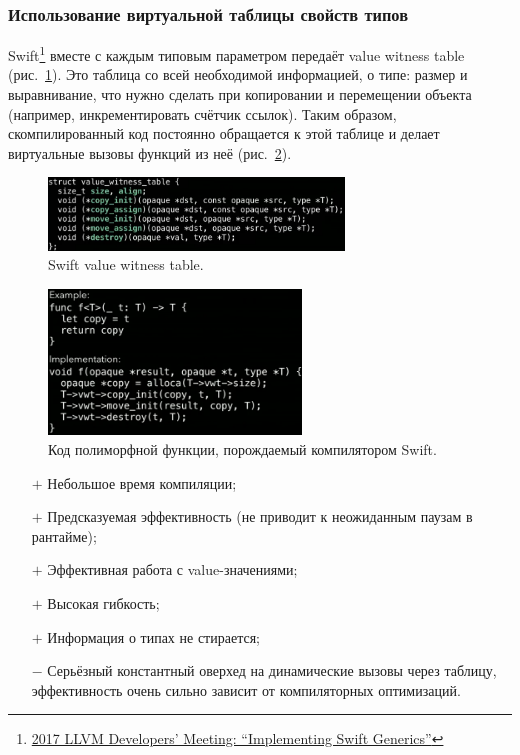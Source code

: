 \documentclass[12pt]{article}
\newcommand{\positive}{$+$} %
\newcommand{\negative}{{\color{red} $-$}} %
\begin{document}

    \subsubsection{Использование виртуальной таблицы свойств типов} \label{subsubsec:swift-generics}

    Swift\footnote{\href{https://youtu.be/ctS8FzqcRug?si=y_ZYnuUOulA33d_X}{2017 LLVM Developers’ Meeting: ``Implementing Swift Generics''}} вместе с каждым типовым параметром передаёт value witness table (рис.~\ref{fig:swift-witness-table}).
    Это таблица со всей необходимой информацией, о типе: размер и выравнивание, что нужно сделать при копировании и перемещении объекта (например, инкрементировать счётчик ссылок).
    Таким образом, скомпилированный код постоянно обращается к этой таблице и делает виртуальные вызовы функций из неё (рис.~\ref{fig:swift-generated-code}).
    \begin{figure}
        \centering
        \includegraphics[width=0.7\textwidth]{figs/swift-witness-table}
        \caption{Swift value witness table.}
        \label{fig:swift-witness-table}
    \end{figure}
    \begin{figure}
        \centering
        \includegraphics[width=0.6\textwidth]{figs/swift-generated-code}
        \caption{Код полиморфной функции, порождаемый компилятором Swift.}
        \label{fig:swift-generated-code}
    \end{figure}

    \begin{itemize}
        \item[\positive] Небольшое время компиляции;
        \item[\positive] Предсказуемая эффективность (не приводит к неожиданным паузам в рантайме);
        \item[\positive] Эффективная работа с value-значениями;
        \item[\positive] Высокая гибкость;
        \item[\positive] Информация о типах не стирается;
        \item[\negative] Серьёзный константный оверхед на динамические вызовы через таблицу, эффективность очень сильно зависит от компиляторных оптимизаций.
    \end{itemize}
\end{document}
